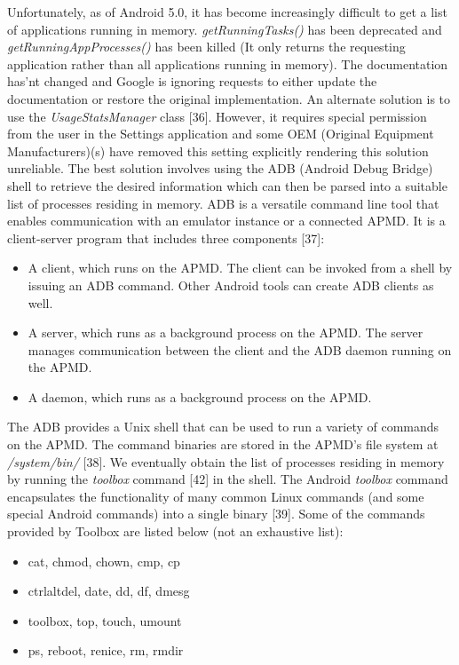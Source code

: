 \documentclass[12pt]{uthesis-v12}  %
\begin{document}
			Unfortunately, as of Android 5.0, it has become increasingly difficult to get a list of applications running in memory. {\em getRunningTasks()} has been deprecated and {\em getRunningAppProcesses()} has been killed (It only returns the requesting application rather than all applications running in memory). The documentation has'nt changed and Google is ignoring requests to either update the documentation or restore the original implementation. An alternate solution is to use the {\em UsageStatsManager} class [36]. However, it requires special permission from the user in the Settings application and some OEM (Original Equipment Manufacturers)(s) have removed this setting explicitly rendering this solution unreliable. The best solution involves using the ADB (Android Debug Bridge) shell to retrieve the desired information which can then be parsed into a suitable list of processes residing in memory. ADB is a versatile command line tool that enables communication with an emulator instance or a connected APMD. It is a client-server program that includes three components [37]:
			
			\begin{itemize}
				\item A client, which runs on the APMD. The client can be invoked from a shell by issuing an ADB command. Other Android tools can create ADB clients as well.
				\item A server, which runs as a background process on the APMD. The server manages communication between the client and the ADB daemon running on the APMD.
				\item A daemon, which runs as a background process on the APMD.
			\end{itemize}
			
			The ADB provides a Unix shell that can be used to run a variety of commands on the APMD. The command binaries are stored in the APMD's file system at {\em /system/bin/} [38]. We eventually obtain the list of processes residing in memory by running the {\em toolbox} command [42] in the shell. The Android {\em toolbox} command encapsulates the functionality of many common Linux commands (and some special Android commands) into a single binary [39]. Some of the commands provided by Toolbox are listed below (not an exhaustive list):
			
			\begin{itemize}
				\item cat, chmod, chown, cmp, cp
				\item ctrlaltdel, date, dd, df, dmesg
				\item toolbox, top, touch, umount
				\item ps, reboot, renice, rm, rmdir
			\end{itemize}
			
\end{document}
